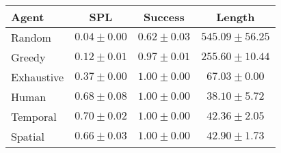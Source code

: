 \begin{tabular}{lccc}
    \toprule
    Agent & SPL & Success & Length \\
    \midrule
    Random & $0.04 \pm 0.00$ & $0.62 \pm 0.03$ & $545.09 \pm 56.25$\\
    Greedy & $0.12 \pm 0.01$ & $0.97 \pm 0.01$ & $255.60 \pm 10.44$\\
    Exhaustive & $0.37 \pm 0.00$ & $1.00 \pm 0.00$ & $67.03 \pm 0.00$\\
    Human & $0.68 \pm 0.08$ & $1.00 \pm 0.00$ & $38.10 \pm 5.72$\\
    Temporal & $0.70 \pm 0.02$ & $1.00 \pm 0.00$ & $42.36 \pm 2.05$\\
    Spatial & $0.66 \pm 0.03$ & $1.00 \pm 0.00$ & $42.90 \pm 1.73$\\
    \bottomrule
\end{tabular}